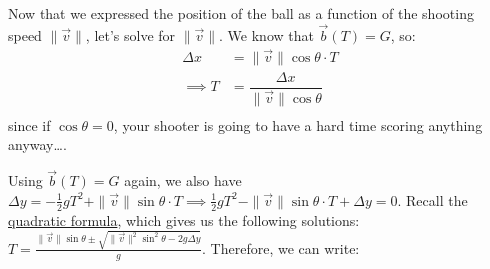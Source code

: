 \documentclass[11pt]{report}
\begin{document}
Now that we expressed the position of the ball as a function of the shooting speed $\|\vec{v}\|$, let's solve for $\|\vec{v}\|$. We know that $\vec{b}(T) = G$, so:
\[
	\begin{aligned}
		\Delta x   & = \|\vec{v}\| \cos \theta \cdot T         \\
		\implies T & = \dfrac{\Delta x}{\|\vec{v}\|\cos\theta} \\
	\end{aligned}
\]
since if $\cos\theta = 0$, your shooter is going to have a hard time scoring anything anyway\ldots.

Using $\vec{b}(T)=G$ again, we also have $\Delta y = -\frac{1}{2}gT^2 + \|\vec{v}\| \sin\theta \cdot T\implies \frac{1}{2}gT^2 - \|\vec{v}\| \sin\theta \cdot T + \Delta y = 0$. Recall the \href{https://en.wikipedia.org/wiki/Quadratic_formula}{quadratic formula}, which gives us the following solutions: $T = \frac{\|\vec{v}\|\sin\theta \pm \sqrt{\|\vec{v}\|^2\sin^2\theta - 2g\Delta y}}{g}$. Therefore, we can write:
\end{document}
